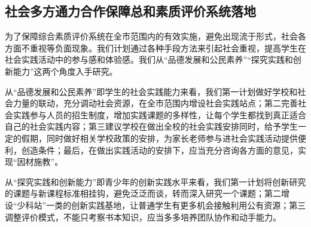 \documentclass[12pt,UTF8]{ctexart}
\begin{document}
\subsection {社会多方通力合作保障总和素质评价系统落地}
\par {
	
	为了保障综合素质评价系统在全市范围内的有效实施，避免出现流于形式，社会各方面不重视等负面现象。我们计划通过各种手段方法来引起社会重视，提高学生在社会实践活动中的参与感和体验感。我们从“品德发展和公民素养”“探究实践和创新能力”这两个角度入手研究。
}
\par {
	
	从“品德发展和公民素养”即学生的社会实践能力来看，我们第一计划做好学校和社会力量的联动，充分调动社会资源，在全市范围内增设社会实践站点；第二完善社会实践参与人员的招生制度，增加实践课题的多样性，让每个学生都找到真正适合自己的社会实践内容；第三建议学校在做出全校的社会实践安排同时，给予学生一定的假期，同时做好相关学校政策的安排，为家长老师参与进社会实践活动提供便利，创造条件；最后，在做出实践活动的安排下，应当充分咨询各方面的意见，实现“因材施教”。
}
\par {
	
	从“探究实践和创新能力”即青少年的创新实践水平来看，我们第一计划将创新研究的课题与新课程标准相挂钩，避免泛泛而谈，转而深入研究一个课题；第二增设“少科站”一类的创新实践基地，让普通学生有更多机会接触利用公有资源；第三调整评价模式，不能只考察书本知识，应当多多培养团队协作和动手能力。
}
\end{document}
